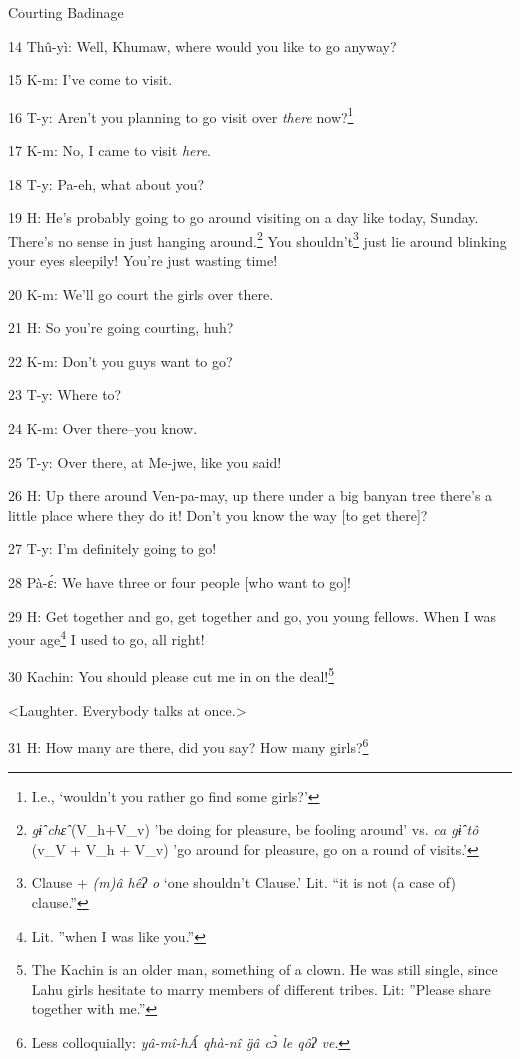 
Courting Badinage

14 Thû-yì: Well, Khumaw, where would you like to go anyway?

15 K-m: I've come to visit.

16 T-y: Aren't you planning to go visit over \textit{there} now?\footnote{I.e., `wouldn't you rather go find some girls?'}

17 K-m: No, I came to visit \textit{here}.

18 T-y: Pa-eh, what about you?

19 H: He's probably going to go around visiting on a day like today, Sunday. There's
no sense in just hanging around.\footnote{\textit{gɨ̂ chɛ̂} (V\_h+V\_v) 'be doing for pleasure, be fooling around' vs. \textit{ca gɨ̂ tô} (v\_V + V\_h + V\_v) 'go around for pleasure, go on a round of visits.'} You shouldn't\footnote{Clause + \textit{(m)â hêʔ o} `one shouldn't Clause.' Lit. ``it is not (a case of) clause.''} just lie around blinking your
eyes sleepily! You're just wasting time!

20 K-m: We'll go court the girls over there.

21 H: So you're going courting, huh?

22 K-m: Don't you guys want to go?

23 T-y: Where to?

24 K-m: Over there--you know.

25 T-y: Over there, at Me-jwe, like you said!

26 H: Up there around Ven-pa-may, up there under a big banyan tree there's a little
place where they do it! Don't you know the way [to get there]?

27 T-y: I'm definitely going to go!

28 Pà-ɛ́: We have three or four people [who want to go]!

29 H: Get together and go, get together and go, you young fellows. When I was your
age\footnote{Lit. ''when I was like you.''} I used to go, all right!

30 Kachin: You should please cut me in on the deal!\footnote{The Kachin is an older man, something of a clown. He was still single, since Lahu girls hesitate to marry members of different tribes. Lit: ''Please share together with me.''}

<Laughter. Everybody talks at once.>

31 H: How many are there, did you say? How many girls?\footnote{Less colloquially: \textit{yâ-mî-hÁ qhà-nî g̈â cɔ̀ le qôʔ ve}.}

